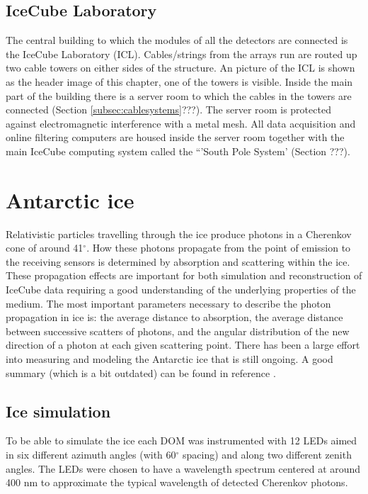 \subsection{IceCube Laboratory}
The central building to which the modules of all the detectors are connected is the IceCube Laboratory (ICL). Cables/strings from the arrays run are routed up two cable towers on either sides of the structure. An picture of the ICL is shown as the header image of this chapter, one of the towers is visible. Inside the main part of the building there is a server room to which the cables in the towers are connected (Section \ref{subsec:cablesystems}???). The server room is protected against electromagnetic interference with a metal mesh. All data acquisition and online filtering computers are housed inside the server room together with the main IceCube computing system called the ``'South Pole System' (Section ???). 
\section{Antarctic ice}
\label{sec:ice}
Relativistic particles travelling through the ice produce photons in a Cherenkov cone of around 41$^\circ$. How these photons propagate from the point of emission to the receiving sensors is determined by absorption and scattering within the ice. These propagation effects are important for both simulation and reconstruction of IceCube data requiring a good understanding of the underlying properties of the medium. The most important parameters necessary to describe the photon propagation in ice is: the average distance to absorption, the average distance between successive scatters of photons, and the angular distribution of the new direction of a photon at each given scattering point. There has been a large effort into measuring and modeling the Antarctic ice that is still ongoing. A good summary (which is a bit outdated) can be found in reference \cite{Aartsen:2013rt}.
\subsection{Ice simulation}
To be able to simulate the ice each DOM was instrumented with 12 LEDs aimed in six different azimuth angles (with 60$^\circ$ spacing) and along two different zenith angles. The LEDs were chosen to have a wavelength spectrum centered at around 400 nm to approximate the typical wavelength of detected Cherenkov photons.

